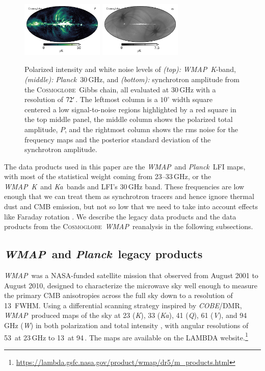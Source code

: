 \documentclass[twocolumn]{../../common/aa}
\def\WMAP{\emph{WMAP}}
\def\COBE{\emph{COBE}}
\def\Planck{\emph{Planck}}
\newcommand{\cosmoglobe}{\textsc{Cosmoglobe}}
\newcommand{\K}[0]{\textit K}
\newcommand{\Ka}[0]{\textit{Ka}}
\newcommand{\Q}[0]{\textit Q}
\newcommand{\V}[0]{\textit V}
\newcommand{\W}[0]{\textit W}
\begin{document}
\begin{figure}
	\includegraphics[width=0.35\textwidth]{figures/polint_CG.pdf}
	\includegraphics[width=0.35\textwidth]{figures/polint_CG_sigma.pdf}
	\caption{
		Polarized intensity and white noise levels of \textit{(top):} \WMAP\ \K-band, \textit{(middle):} \Planck\ 30\,GHz, and \textit{(bottom):} synchrotron amplitude from the \cosmoglobe\ Gibbs chain, all evaluated at 30\,GHz with a resolution of $72\arcm$. The leftmost column is a $10^\circ$ width square centered a low signal-to-noise regions highlighted by a red square in the top middle panel, the middle column shows the polarized total amplitude, $P$, and the rightmost column shows the rms noise for the frequency maps and the posterior standard deviation of the synchrotron amplitude.
		}
       \label{fig:synch_polint}
\end{figure}

The data products used in this paper are the \WMAP\ and \Planck\ LFI maps, with most of the statistical weight coming from 23--33\,GHz, or the \WMAP\ \K\ and \Ka\ bands and LFI's 30\,GHz band. These frequencies are low enough that we can treat them as synchrotron tracers and hence ignore thermal dust and CMB emission, but not so low that we need to take into account effects like Faraday rotation \citep{fuskeland:2019}. We describe the legacy data products and the data products from the \cosmoglobe\ \WMAP\ reanalysis in the following subsections.


\subsection{\WMAP\ and \Planck\ legacy products}
\label{sec:wmap_data}

\WMAP\ was a NASA-funded satellite mission that observed from August 2001 to August 2010, designed to characterize the microwave sky well enough to measure the primary CMB anisotropies across the full sky down to a resolution of 13\arcm\ FWHM. Using a differential scanning strategy inspired by \COBE/DMR,
\WMAP\ produced maps of the sky at 23 (\K), 33 (\Ka), 41 (\Q), 61 (\V), and 94\,GHz (\W) in both polarization and total intensity \citep{bennett2012}, with angular resolutions of 53\arcm\ at 23\,GHz to 13\arcm\ at 94\,\GHz. 
The maps are available on the LAMBDA website.\footnote{\url{https://lambda.gsfc.nasa.gov/product/wmap/dr5/m_products.html}} 
\end{document}
